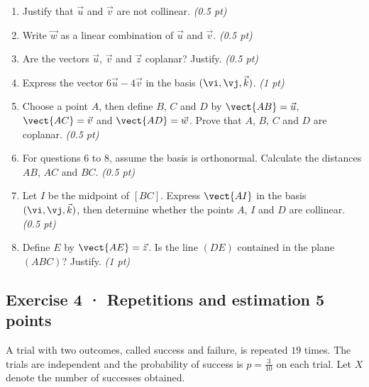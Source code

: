 \begin{enumerate}

\item Justify that $\vec u$ and $\vec v$ are not collinear. \hfill\textit{(0.5 pt)}

\item Write $\vec w$ as a linear combination of $\vec u$ and $\vec v$. \hfill\textit{(0.5 pt)}

\item Are the vectors $\vec u$, $\vec v$ and $\vec z$ coplanar? Justify. \hfill\textit{(0.5 pt)}

\item Express the vector $6\vec u-4\vec v$ in the basis $(\vi,\vj,\vec k)$. \hfill\textit{(1 pt)}

\item Choose a point $A$, then define $B$, $C$ and $D$ by $\vect{AB}=\vec u$, $\vect{AC}=\vec v$ and $\vect{AD}=\vec w$. Prove that $A$, $B$, $C$ and $D$ are coplanar. \hfill\textit{(0.5 pt)}

\item For questions 6 to 8, assume the basis is orthonormal. Calculate the distances $AB$, $AC$ and $BC$. \hfill\textit{(0.5 pt)}

\item Let $I$ be the midpoint of $[BC]$. Express $\vect{AI}$ in the basis $(\vi,\vj,\vec k)$, then determine whether the points $A$, $I$ and $D$ are collinear. \hfill\textit{(0.5 pt)}

\item Define $E$ by $\vect{AE}=\vec z$. Is the line $(DE)$ contained in the plane $(ABC)$? Justify. \hfill\textit{(1 pt)}

\end{enumerate}

\subsection*{Exercise 4 · Repetitions and estimation \hfill 5 points}A trial with two outcomes, called success and failure, is repeated $19$ times. The trials are independent and the probability of success is $p=\frac{3}{10}$ on each trial. Let $X$ denote the number of successes obtained.

